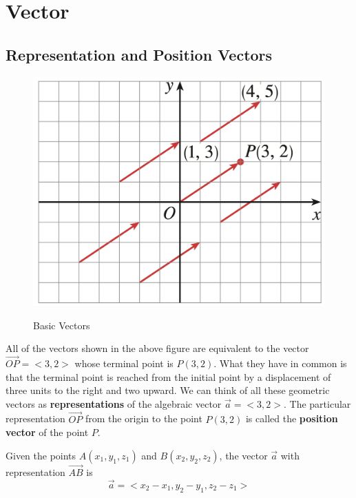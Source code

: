 \chapter{Vector}

\section{Representation and Position Vectors}

\begin{figure}[h]
    \centering
    \cite{calculus}
    \includegraphics[scale=0.4]{appendices/figures/figure001}
    \caption{Basic Vectors}
    \label{Basic Vectors}
\end{figure}

All of the vectors shown in the above figure are equivalent to the vector $\vec{OP}=<3, 2>$ whose terminal point is $P(3, 2)$. What they have in common is that the
terminal point is reached from the initial point by a displacement of three units to the right and two upward. We can think of all these geometric vectors as \textbf{representations} of the algebraic vector $\vec{a}=<3, 2>$. The particular representation $\vec{OP}$ from the origin to the point $P(3, 2)$ is called the \textbf{position vector} of the point $P$.

\begin{definition}
Given the points $A(x_1, y_1, z_1)$ and $B(x_2, y_2, z_2)$, the vector $\vec{a}$ with representation $\vec{AB}$ is
    \begin{equation}
        \vec{a} = <x_2 - x_1, y_2 - y_1, z_2 - z_1>
    \end{equation}
\end{definition}

